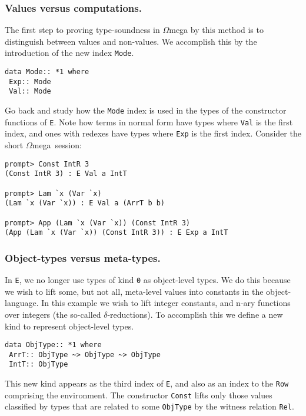 \documentclass[11pt,twoside,A4]{llncs}
\newcommand{\om}{\emph{$\Omega$}mega}
\begin{document}
\subsubsection{Values versus computations.}

The first step to proving type-soundness in \om{} by this method is to 
distinguish between values and non-values.  We accomplish this by
the introduction of the new index {\tt Mode}. 

{\small
\begin{verbatim}
data Mode:: *1 where
 Exp:: Mode
 Val:: Mode
\end{verbatim}}

\noindent
Go back and study how the {\tt Mode} index is used
in the types of the constructor functions of {\tt E}.
Note how terms in normal form have types where {\tt Val}
is the first index, and ones with redexes have types where {\tt Exp} is
the first index. Consider the short \om\ session:

{\small
\begin{verbatim}
prompt> Const IntR 3
(Const IntR 3) : E Val a IntT 

prompt> Lam `x (Var `x)
(Lam `x (Var `x)) : E Val a (ArrT b b)

prompt> App (Lam `x (Var `x)) (Const IntR 3)
(App (Lam `x (Var `x)) (Const IntR 3)) : E Exp a IntT
\end{verbatim}}

\subsubsection{Object-types versus meta-types.}

In {\tt E}, we no longer use types of kind {\tt *0} as object-level
types. We do this because we wish to lift some, but not all,
meta-level values into constants in the object-language. In this
example we wish to lift integer constants, and n-ary functions
over integers (the so-called $\delta$-reductions). To accomplish this we
define a new kind to represent object-level types.

{\small
\begin{verbatim}
data ObjType:: *1 where
 ArrT:: ObjType ~> ObjType ~> ObjType
 IntT:: ObjType
\end{verbatim}}
This new kind appears as the third index of {\tt E}, and also as an
index to the {\tt Row} comprising the environment.
The constructor {\tt Const} lifts only those values classified
by types that are related to some {\tt ObjType} by the witness
relation {\tt Rel}.
\end{document}
